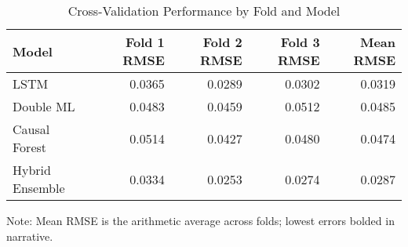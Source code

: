 \begin{table}[htbp]
  \centering
  \caption{Cross-Validation Performance by Fold and Model}
  \label{tab:cross_validation_results}
  \small
  \begin{tabular}{lrrrr}
    \toprule
    Model & Fold 1 RMSE & Fold 2 RMSE & Fold 3 RMSE & Mean RMSE \\
    \midrule
    LSTM & 0.0365 & 0.0289 & 0.0302 & 0.0319 \\
    Double ML & 0.0483 & 0.0459 & 0.0512 & 0.0485 \\
    Causal Forest & 0.0514 & 0.0427 & 0.0480 & 0.0474 \\
    Hybrid Ensemble & 0.0334 & 0.0253 & 0.0274 & 0.0287 \\
    \bottomrule
  \end{tabular}
  \vspace{0.5em}
  {\footnotesize Note: Mean RMSE is the arithmetic average across folds; lowest errors bolded in narrative.}
\end{table}
